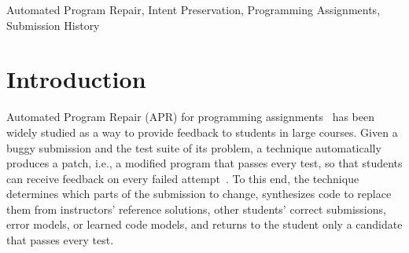 \documentclass[10pt,conference]{IEEEtran}
\begin{document}
\begin{abstract}
\end{abstract}

\begin{IEEEkeywords}
Automated Program Repair, Intent Preservation, Programming Assignments, Submission History
\end{IEEEkeywords}

\section{Introduction}\label{sec:intro}

Automated Program Repair (APR) for programming assignments~\cite{singh2013automated, gulwani2018automated, hu2019re} has been widely studied as a way to provide feedback to students in large courses. Given a buggy submission and the test suite of its problem, a technique automatically produces a patch, i.e., a modified program that passes every test, so that students can receive feedback on every failed attempt~\cite{paiva2025incremental, fan2025software}. To this end, the technique determines which parts of the submission to change, synthesizes code to replace them from instructors' reference solutions, other students' correct submissions, error models, or learned code models, and returns to the student only a candidate that passes every test.
\end{document}
